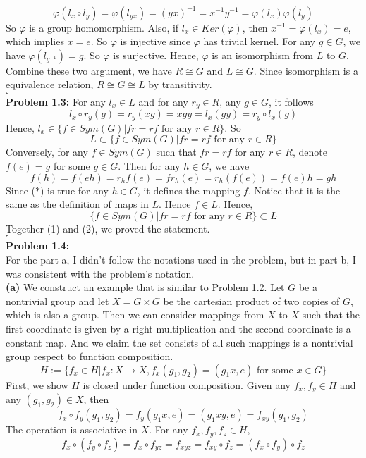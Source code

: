 \documentclass[12pt]{amsart}
\begin{document}
 \[\varphi(l_x\circ l_y)=\varphi(l_{yx})=(yx)^{-1}=x^{-1}y^{-1}=\varphi(l_x)\varphi(l_y)\]
 So $\varphi$ is a group homomorphism. Also, if $l_x\in Ker(\varphi)$, then $x^{-1}=\varphi(l_x)=e$, which implies $x=e$. So $\varphi$ is injective since $\varphi$ has trivial kernel. For any $g\in G$, we have $\varphi(l_{g^{-1}})=g$. So $\varphi$ is surjective. Hence, $\varphi$ is an isomorphism from $L$ to $G$.\\
Combine these two argument, we have $R\cong G$ and $L\cong G$. Since isomorphism is a equivalence relation, $R\cong G \cong L$ by transitivity.
\\\phantom{qed}\hfill$\square$\\
\textbf{Problem 1.3:} For any $l_x\in L$ and for any $r_y\in R$, any $g\in G$, it follows 
\[l_x\circ r_y(g)=r_y(xg)=xgy=l_x(gy)=r_y\circ l_x(g)\]
Hence, $l_x \in \{f\in Sym(G)|fr=rf \text{ for any }r\in R\}$. So \[L\subset \{f\in Sym(G)|fr=rf \text{ for any }r\in R\}\tag{1}\]
Conversely, for any $f\in Sym(G)$ such that $fr=rf$ for any $r\in R$, denote $f(e)=g$ for some $g\in G$. Then for any $h\in G$, we have 
\[f(h)=f(eh)=r_hf(e)=fr_h(e)=r_h(f(e))=f(e)h=gh\tag{$\ast$}\]
Since ($\ast$) is true for any $h\in G$, it defines the mapping $f$. Notice that it is the same as the definition of maps in $L$. Hence $f\in L$. Hence, \[\{f\in Sym(G)|fr=rf \text{ for any }r\in R\}\subset L\tag{2}\]
Together (1) and (2), we proved the statement.
\\\phantom{qed}\hfill$\square$\\
\textbf{Problem 1.4:}\\
For the part a, I didn't follow the notations used in the problem, but in part b, I was consistent with the problem's notation.\\
\textbf{(a)} We construct an example that is similar to Problem 1.2. Let $G$ be a nontrivial group and let $X=G \times G$ be the cartesian product of two copies of $G$, which is also a group. Then we can consider mappings from $X$ to $X$ such that the first coordinate is given by a right multiplication and the second coordinate is a constant map. And we claim the set consists of all such mappings is a nontrivial group respect to function composition. 
\[H:=\{f_x\in H| f_x:X\rightarrow X, f_x(g_1,g_2)=(g_1x,e) \text{ for some } x\in G\}\]
First, we show $H$ is closed under function composition. Given any $f_x,f_y\in H$ and any $(g_1,g_2)\in X$, then 
\[f_x\circ f_y(g_1,g_2)=f_y(g_1x,e)=(g_1xy,e)=f_{xy}(g_1,g_2)\]
The operation is associative in $X$. For any $f_x,f_y,f_z\in H$, 
\[f_x\circ (f_y\circ f_z)=f_x\circ f_{yz}=f_{xyz}=f_{xy}\circ f_z=(f_x\circ f_y)\circ f_z\]
\end{document}
